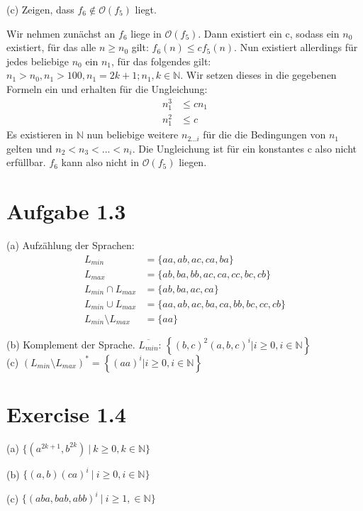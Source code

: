 \documentclass{article}
\begin{document}
\noindent (c) Zeigen, dass $f_6 \notin \mathcal{O}(f_5)$ liegt. 

Wir nehmen zun\"achst an $f_6$ liege in $\mathcal{O}(f_5)$. Dann existiert ein c, sodass ein $n_0$ existiert, f\"ur das alle $n \geq n_0$ gilt: $f_6(n)\leq cf_5(n)$. Nun existiert allerdings f\"ur jedes beliebige $n_0$ ein $n_1$, f\"ur das folgendes gilt: $n_1>n_0,n_1>100,n_1 =2k+1; n_1,k \in \mathbb{N}$. Wir setzen dieses in die gegebenen Formeln ein und erhalten f\"ur die Ungleichung:
\begin{align*}
n_1^3 &\leq cn_1 \\
n_1^2 &\leq c
\end{align*}
\noindent Es existieren in $\mathbb{N}$ nun beliebige weitere $n_{2...i}$ f\"ur die die Bedingungen von $n_1$ gelten und $n_2<n_3<...<n_i$. Die Ungleichung ist f\"ur ein konstantes c also nicht erf\"ullbar. $f_6$ kann also nicht in $\mathcal{O}(f_5)$ liegen.

\section*{Aufgabe 1.3}

(a) Aufz\"ahlung der Sprachen:
\begin{align*}
L_{min} &= \{aa,ab,ac,ca,ba\}\\
L_{max} &= \{ab,ba,bb,ac,ca,cc,bc,cb\}\\
L_{min}\cap L_{max} &= \{ab,ba,ac,ca\}\\
L_{min}\cup L_{max} &= \{aa,ab,ac,ba,ca,bb,bc,cc,cb\}\\
L_{min}\setminus L_{max} &= \{aa\}
\end{align*}

\noindent (b) Komplement der Sprache. $\overline{L_{min}}$:
$\left\{(b,c)^2(a,b,c)^i | i\geq 0,i\in \mathbb{N}\right\} $\\
(c) $(L_{min} \setminus L_{max})^*=\left\{(aa)^i | i\geq 0,i\in \mathbb{N} \right\}$

\section*{Exercise 1.4}
\noindent (a) $\{(a^{2k+1},b^{2k})\ |\ k\geq 0,k\in \mathbb{N} \}$ %

\noindent (b) $\{ (a,b)(ca)^i\ |\ i\geq 0,i\in \mathbb{N}\}$ %

\noindent (c) $\{(aba,bab,abb)^i\ |\ i\geq 1,\in \mathbb{N} \}$
\end{document}
